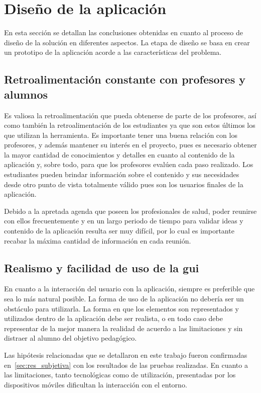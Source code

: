 
\section{Diseño de la aplicación}

En esta sección se detallan las conclusiones obtenidas en cuanto al proceso de
diseño de la solución en diferentes aspectos. La etapa de diseño se basa en 
crear un prototipo de la aplicación acorde a las características del problema.

\subsection{Retroalimentación constante con profesores y alumnos}

Es valiosa la retroalimentación que pueda obtenerse de parte de los profesores,
así como también la retroalimentación de los estudiantes ya que son estos
últimos los que utilizan la herramienta. Es importante tener una buena relación
con los profesores, y además mantener su interés en el proyecto, pues es
necesario obtener la mayor cantidad de conocimientos y detalles en cuanto al
contenido de la aplicación y, sobre todo, para que los profesores evalúen cada
paso realizado. Los estudiantes pueden brindar información sobre el contenido y
sus necesidades desde otro punto de vista totalmente válido pues son los
usuarios finales de la aplicación.

Debido a la apretada agenda que poseen los profesionales de salud, poder
reunirse con ellos frecuentemente y en un largo periodo de tiempo para validar
ideas y contenido de la aplicación resulta ser muy difícil, por lo cual es
importante recabar la máxima cantidad de información en cada reunión.

\subsection{Realismo y facilidad de uso de la \Gls{gui}}

En cuanto a la interacción del usuario con la aplicación, siempre es preferible
que sea lo más natural posible. La forma de uso de la aplicación no debería ser
un obstáculo para utilizarla. La forma en que los elementos son representados y
utilizados dentro de la aplicación debe ser realista, o en todo caso debe
representar de la mejor manera la realidad de acuerdo a las limitaciones y sin
distraer al alumno del objetivo pedagógico.

Las hipótesis relacionadas que se detallaron en este trabajo fueron confirmadas
en~\ref{sec:res_subjetiva} con los resultados de las pruebas realizadas. En
cuanto a las limitaciones, tanto tecnológicas como de utilización, presentadas
por los dispositivos móviles dificultan la interacción con el entorno. 

